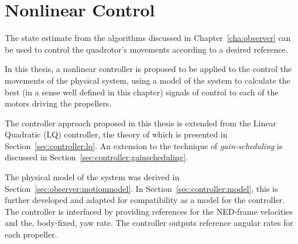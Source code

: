 \chapter{Nonlinear Control}
\label{cha:controller}
    The state estimate from the algorithms discussed in Chapter~\ref{cha:observer}
    can be used to control the quadrotor's movements according to a desired
    reference.

    In this thesis, a nonlinear controller is proposed to be applied to the
    control the movements of the
    physical system, using a model of the system to calculate the best
    (in a sense well defined in this chapter) signals of control to each
    of the motors driving the propellers.

    The controller approach proposed in this thesis is extended from the Linear Quadratic (LQ)
    controller, the theory of which is presented in Section~\ref{sec:controller:lq}.
    An extension to the technique of \textit{gain-scheduling} is discussed
    in Section~\ref{sec:controller:gainscheduling}.

    The physical model of the system was derived in Section~\ref{sec:observer:motionmodel}.
    In Section~\ref{sec:controller:model}, this is further developed
    and adapted for compatibility as a model for the controller.
    The controller is interfaced by providing references
    for the NED-frame velocities and the, body-fixed, yaw rate.
    The controller outputs reference angular rates for each propeller.

    
    
    
